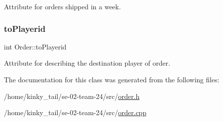 Attribute for orders shipped in a week. 

\mbox{\label{class_order_a0dd2d933c8d7749a9f1d8d40e4424ab7}} 
\subsubsection{\texorpdfstring{to\+Playerid}{toPlayerid}}
{\footnotesize\ttfamily int Order\+::to\+Playerid\hspace{0.3cm}{\ttfamily [private]}}



Attribute for describing the destination player of order. 



The documentation for this class was generated from the following files\+:\begin{DoxyCompactItemize}
\item 
/home/kinky\+\_\+tail/se-\/02-\/team-\/24/src/\hyperlink{order_8h}{order.\+h}\item 
/home/kinky\+\_\+tail/se-\/02-\/team-\/24/src/\hyperlink{order_8cpp}{order.\+cpp}\end{DoxyCompactItemize}
